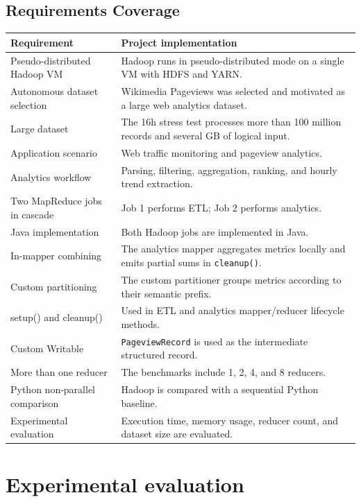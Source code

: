 \documentclass[12pt,a4paper]{report}
\begin{document}
\section{Requirements Coverage}

\begin{longtable}{p{}p{}}
\toprule
\textbf{Requirement} & \textbf{Project implementation} \\
\midrule
\endhead
Pseudo-distributed Hadoop VM & Hadoop runs in pseudo-distributed mode on a single VM with HDFS and YARN. \\
Autonomous dataset selection & Wikimedia Pageviews was selected and motivated as a large web analytics dataset. \\
Large dataset & The 16h stress test processes more than 100 million records and several GB of logical input. \\
Application scenario & Web traffic monitoring and pageview analytics. \\
Analytics workflow & Parsing, filtering, aggregation, ranking, and hourly trend extraction. \\
Two MapReduce jobs in cascade & Job 1 performs ETL; Job 2 performs analytics. \\
Java implementation & Both Hadoop jobs are implemented in Java. \\
In-mapper combining & The analytics mapper aggregates metrics locally and emits partial sums in \texttt{cleanup()}. \\
Custom partitioning & The custom partitioner groups metrics according to their semantic prefix. \\
setup() and cleanup() & Used in ETL and analytics mapper/reducer lifecycle methods. \\
Custom Writable & \texttt{PageviewRecord} is used as the intermediate structured record. \\
More than one reducer & The benchmarks include 1, 2, 4, and 8 reducers. \\
Python non-parallel comparison & Hadoop is compared with a sequential Python baseline. \\
Experimental evaluation & Execution time, memory usage, reducer count, and dataset size are evaluated. \\
\bottomrule
\end{longtable}

\chapter{Experimental evaluation}
\end{document}
